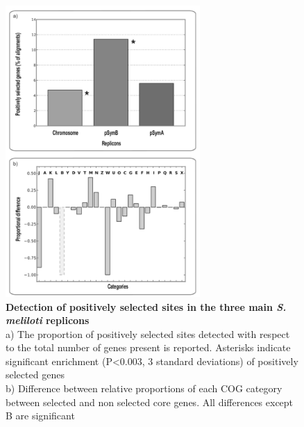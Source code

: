 \begin{figure}[!t]
	\center
    \includegraphics[width=0.66\textwidth]{figures/4/thesis_30}
	\caption{\label{fig:positivereplicons}\textbf{Detection of positively selected sites in the three main \textit{S. meliloti} replicons}\\
	a) The proportion of positively selected sites detected with respect to the total number of genes present is reported. Asterisks indicate significant enrichment (P<0.003, 3 standard deviations) of positively selected genes\\
	b) Difference between relative proportions of each COG category between selected and non selected core genes. All differences except B are significant}
\end{figure}

